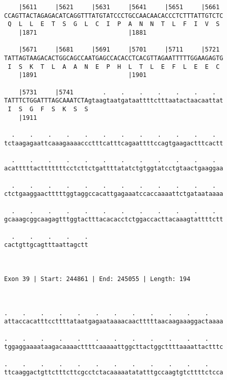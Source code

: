 \documentclass{article}
\begin{document}
\begin{Verbatim}
    |5611     |5621     |5631     |5641     |5651     |5661 
CCAGTTACTAGAGACATCAGGTTTATGTATCCCTGCCAACAACACCCTCTTTATTGTCTC
 Q  L  L  E  T  S  G  L  C  I  P  A  N  N  T  L  F  I  V  S 
    |1871                         |1881                     
  
    |5671     |5681     |5691     |5701     |5711     |5721 
TATTAGTAAGACACTGGCAGCCAATGAGCCACACCTCACGTTAGAATTTTTGGAAGAGTG
 I  S  K  T  L  A  A  N  E  P  H  L  T  L  E  F  L  E  E  C 
    |1891                         |1901                     
  
    |5731     |5741        .    .    .    .    .    .    .  
TATTTCTGGATTTAGCAAATCTAgtaagtaatgataattttctttaatactaacaattat
 I  S  G  F  S  K  S  S                                     
    |1911                                                   
  
  .    .    .    .    .    .    .    .    .    .    .    .  
tctaagagaattcaaagaaaaccctttcatttcagaattttccagtgaagactttcactt
                                                            
  .    .    .    .    .    .    .    .    .    .    .    .  
acatttttactttttttcctcttctgattttatatctgtggtatcctgtaactgaaggaa
                                                            
  .    .    .    .    .    .    .    .    .    .    .    .  
ctctgaaggaactttttggtaggccacattgagaaatccaccaaaattctgataataaaa
                                                            
  .    .    .    .    .    .    .    .    .    .    .    .  
gcaaagcggcaagagtttggtactttacacacctctggaccacttacaaagtattttctt
                                                            
  .    .    .    .    .
cactgttgcagtttaattagctt
                       
                       
 
Exon 39 | Start: 244861 | End: 245055 | Length: 194



.    .    .    .    .    .    .    .    .    .    .    .    
attaccacatttccttttataatgagaataaaacaactttttaacaagaaaggactaaaa
                                                            
.    .    .    .    .    .    .    .    .    .    .    .    
tggaggaaaataagacaaaacttttcaaaaattggcttactggcttttaaaattactttc
                                                            
.    .    .    .    .    .    .    .    .    .    .    .    
ttcaaggactgttctttcttcgcctctacaaaaatatatttgccaagtgtcttttctcca
                                                            

\end{Verbatim}
\end{document}
